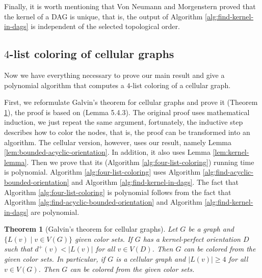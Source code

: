 \documentclass[a4paper, 12pt]{article}
\newtheorem{theo}[lem]{Theorem}
\begin{document}
Finally, it is worth mentioning that Von Neumann and Morgenstern \cite{neumann} proved that the kernel of a DAG is unique, that is, the output of Algorithm \ref{alg:find-kernel-in-dags} is independent of the selected topological order.
\subsection{$4$-list coloring of cellular graphs}\label{sec:4-list-coloring}
Now we have everything necessary to prove our main result and give a polynomial algorithm that computes a $4$-list coloring of a cellular graph. 

First, we reformulate Galvin's theorem for cellular graphs and prove it (Theorem \ref{thm:galvin-cellular}), the proof is based on \cite{citeulike:395714} (Lemma 5.4.3). The original proof uses mathematical induction, we just repeat the same argument, fortunately, the inductive step describes how to color the nodes, that is, the proof can be transformed into an algorithm. The cellular version, however, uses our result, namely Lemma \ref{lem:bounded-acyclic-orientation}. In addition, it also uses Lemma \ref{lem:kernel-lemma}. Then we prove that its (Algorithm \ref{alg:four-list-coloring}) running time is polynomial. Algorithm \ref{alg:four-list-coloring} uses Algorithm \ref{alg:find-acyclic-bounded-orientation} and Algorithm \ref{alg:find-kernel-in-dags}. The fact that Algorithm \ref{alg:four-list-coloring} is polynomial follows from the fact that Algorithm \ref{alg:find-acyclic-bounded-orientation} and Algorithm \ref{alg:find-kernel-in-dags} are polynomial.
\begin{theo}[Galvin's theorem for cellular graphs]\label{thm:galvin-cellular} Let $G$ be a graph and $\lbrace L(v) \mid v \in V(G) \rbrace$ given color sets. If $G$ has a kernel-perfect orientation $D$ such that $d^+(v) < |L(v)|$ for all $v \in V(D)$. Then $G$ can be colored from the given color sets.
In particular, if $G$ is a cellular graph and $|L(v)| \geqslant 4$ for all $v \in V(G)$. Then $G$ can be colored from the given color sets.
\end{theo}
\end{document}
